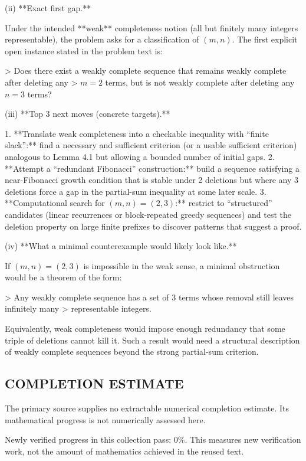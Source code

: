 (ii) **Exact first gap.**

Under the intended **weak** completeness notion (all but finitely many integers representable), the
problem asks for a classification of \((m,n)\). The first explicit open instance stated in the
problem text is:

> Does there exist a weakly complete sequence that remains weakly complete after deleting any
> \(m=2\) terms, but is not weakly complete after deleting any \(n=3\) terms?

(iii) **Top 3 next moves (concrete targets).**

1. **Translate weak completeness into a checkable inequality with “finite slack”:** find a necessary
   and sufficient criterion (or a usable sufficient criterion) analogous to Lemma 4.1 but allowing a
   bounded number of initial gaps.
2. **Attempt a “redundant Fibonacci” construction:** build a sequence satisfying a near-Fibonacci
   growth condition that is stable under 2 deletions but where any 3 deletions force a gap in the
   partial-sum inequality at some later scale.
3. **Computational search for \((m,n)=(2,3)\):** restrict to “structured” candidates (linear recurrences
   or block-repeated greedy sequences) and test the deletion property on large finite prefixes to
   discover patterns that suggest a proof.

(iv) **What a minimal counterexample would likely look like.**

If \((m,n)=(2,3)\) is impossible in the weak sense, a minimal obstruction would be a theorem of the
form:

> Any weakly complete sequence has a set of 3 terms whose removal still leaves infinitely many
> representable integers.

Equivalently, weak completeness would impose enough redundancy that some triple of deletions cannot
kill it. Such a result would need a structural description of weakly complete sequences beyond the
strong partial-sum criterion.




\subsection*{COMPLETION ESTIMATE}
The primary source supplies no extractable numerical completion estimate. Its mathematical progress is not numerically assessed here.

Newly verified progress in this collection pass: $0\%$. This measures new verification work, not the amount of mathematics achieved in the reused text.
